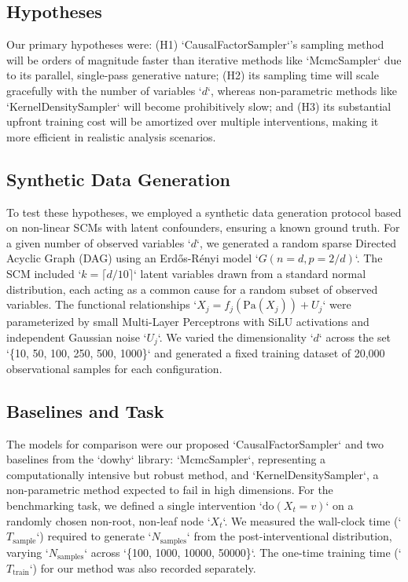 \documentclass{article} %
\begin{document}
\subsection{Hypotheses}
Our primary hypotheses were: (H1) `CausalFactorSampler`'s sampling method will be orders of magnitude faster than iterative methods like `McmcSampler` due to its parallel, single-pass generative nature; (H2) its sampling time will scale gracefully with the number of variables `$d$`, whereas non-parametric methods like `KernelDensitySampler` will become prohibitively slow; and (H3) its substantial upfront training cost will be amortized over multiple interventions, making it more efficient in realistic analysis scenarios.

\subsection{Synthetic Data Generation}
To test these hypotheses, we employed a synthetic data generation protocol based on non-linear SCMs with latent confounders, ensuring a known ground truth. For a given number of observed variables `$d$`, we generated a random sparse Directed Acyclic Graph (DAG) using an Erdős-Rényi model `$G(n=d, p=2/d)$`. The SCM included `$k = \lceil d/10 \rceil$` latent variables drawn from a standard normal distribution, each acting as a common cause for a random subset of observed variables. The functional relationships `$X_j = f_j(\mathrm{Pa}(X_j)) + U_j$` were parameterized by small Multi-Layer Perceptrons with SiLU activations and independent Gaussian noise `$U_j$`. We varied the dimensionality `$d$` across the set `\{10, 50, 100, 250, 500, 1000\}` and generated a fixed training dataset of 20,000 observational samples for each configuration.

\subsection{Baselines and Task}
The models for comparison were our proposed `CausalFactorSampler` and two baselines from the `dowhy` library: `McmcSampler`, representing a computationally intensive but robust method, and `KernelDensitySampler`, a non-parametric method expected to fail in high dimensions. For the benchmarking task, we defined a single intervention `$\mathrm{do}(X_t = v)$` on a randomly chosen non-root, non-leaf node `$X_t$`. We measured the wall-clock time (`$T_{\mathrm{sample}}$`) required to generate `$N_{\mathrm{samples}}$` from the post-interventional distribution, varying `$N_{\mathrm{samples}}$` across `\{100, 1000, 10000, 50000\}`. The one-time training time (`$T_{\mathrm{train}}$`) for our method was also recorded separately.
\end{document}
